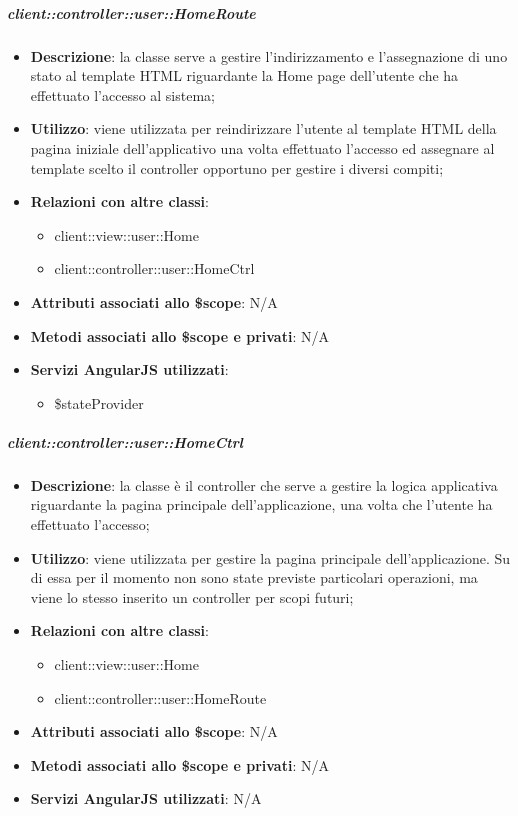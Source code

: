 		\subparagraph{client::controller::user::HomeRoute} %
		\label{subp:bdsm_app_client_controller_user_homerouteconfig}
			\begin{itemize}
				\item \textbf{Descrizione}: la classe serve a gestire l'indirizzamento e l'assegnazione di uno stato al template HTML riguardante la Home page dell'utente che ha effettuato l'accesso al sistema;
				\item \textbf{Utilizzo}: viene utilizzata per reindirizzare l'utente al template HTML della pagina iniziale dell'applicativo una volta effettuato l'accesso ed assegnare al template scelto il controller opportuno per gestire i diversi compiti;
				\item \textbf{Relazioni con altre classi}:
					\begin{itemize}
						\item client::view::user::Home
						\item client::controller::user::HomeCtrl
					\end{itemize}
				\item \textbf{Attributi associati allo \$scope}: N/A
				\item \textbf{Metodi associati allo \$scope e privati}: N/A
				\item \textbf{Servizi AngularJS utilizzati}:
					\begin{itemize}
						\item \$stateProvider
					\end{itemize}
			\end{itemize}

		\subparagraph{client::controller::user::HomeCtrl} %
		\label{subp:client_controller_user_homectrl}
			\begin{itemize}
				\item \textbf{Descrizione}: la classe è il controller che serve a gestire la logica applicativa riguardante la pagina principale dell'applicazione, una volta che l'utente ha effettuato l'accesso;
				\item \textbf{Utilizzo}: viene utilizzata per gestire la pagina principale dell'applicazione. Su di essa per il momento non sono state previste particolari operazioni, ma viene lo stesso inserito un controller per scopi futuri;
				\item \textbf{Relazioni con altre classi}:
					\begin{itemize}
						\item client::view::user::Home
						\item client::controller::user::HomeRoute
					\end{itemize}

				\item \textbf{Attributi associati allo \$scope}: N/A
				\item \textbf{Metodi associati allo \$scope e privati}: N/A
				\item \textbf{Servizi AngularJS utilizzati}: N/A

			\end{itemize}

